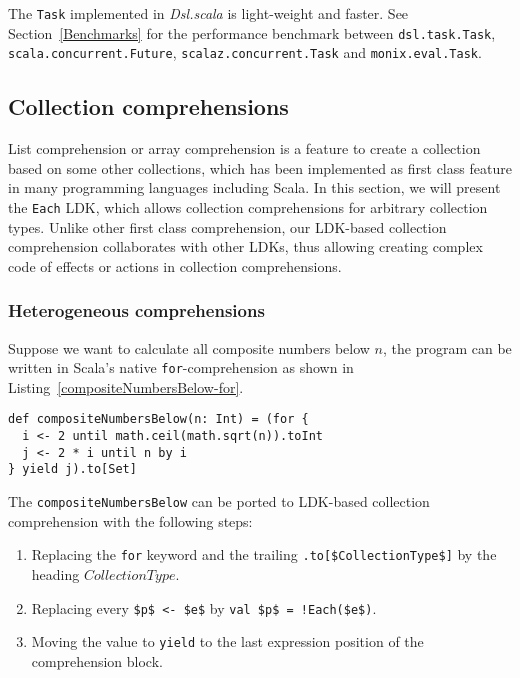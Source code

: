 The \lstinline{Task} implemented in \textit{Dsl.scala} is light-weight and faster. See Section~\ref{Benchmarks} for the performance benchmark between \lstinline{dsl.task.Task}, \lstinline{scala.concurrent.Future}, \lstinline{scalaz.concurrent.Task} and \lstinline{monix.eval.Task}.

\subsection{Collection comprehensions}\label{Collection comprehensions}

List comprehension or array comprehension is a feature to create a collection based on some other collections, which has been implemented as first class feature in many programming languages including Scala. In this section, we will present the \lstinline{Each} LDK, which allows collection comprehensions for arbitrary collection types. Unlike other first class comprehension, our LDK-based collection comprehension collaborates with other LDKs, thus allowing creating complex code of effects or actions in collection comprehensions.

\subsubsection{Heterogeneous comprehensions}\label{Heterogeneous comprehensions}

Suppose we want to calculate all composite numbers below $n$, the program can be written in Scala's native \lstinline{for}-comprehension as shown in Listing~\ref{compositeNumbersBelow-for}.

\begin{lstlisting}[caption={Calculating all composite numbers below $n$ with \lstinline{for}-comprehension},label={compositeNumbersBelow-for}]
def compositeNumbersBelow(n: Int) = (for {
  i <- 2 until math.ceil(math.sqrt(n)).toInt
  j <- 2 * i until n by i
} yield j).to[Set]
\end{lstlisting}

The \lstinline{compositeNumbersBelow} can be ported to LDK-based collection comprehension with the following steps:

\begin{enumerate}
  \item Replacing the \lstinline{for} keyword and the trailing \lstinline[mathescape=true]{.to[$CollectionType$]} by the heading $CollectionType$.
  \item Replacing every \lstinline[mathescape=true]{$p$ <- $e$} by \lstinline[mathescape=true]{val $p$ = !Each($e$)}.
  \item Moving the value to \lstinline{yield} to the last expression position of the comprehension block.
\end{enumerate}

